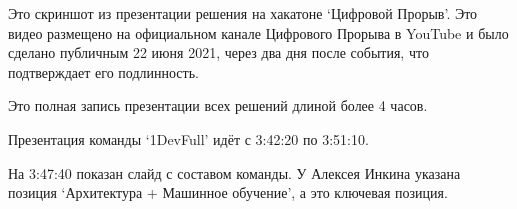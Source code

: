 
Это скриншот из презентации решения на хакатоне `Цифровой Прорыв'.
Это видео размещено на официальном канале Цифрового Прорыва в YouTube
и было сделано публичным 22 июня 2021, через два дня после события,
что подтверждает его подлинность.

Это полная запись презентации всех решений длиной более 4 часов.

Презентация команды `1DevFull' идёт с 3:42:20 по 3:51:10.

На 3:47:40 показан слайд с составом команды.
У Алексея Инкина указана позиция `Архитектура + Машинное обучение',
а это ключевая позиция.



\pagebreak
